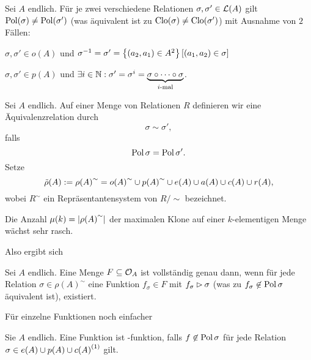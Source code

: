 \documentclass{book}
\begin{document}
\begin{remark}
    Sei $A$ endlich. Für je zwei verschiedene Relationen $\sigma, \sigma'\in\mathcal{L}(A)$ gilt $\mathop\mathrm{Pol}(\sigma)\neq \mathop\mathrm{Pol}(\sigma')$ (was äquivalent ist zu $\mathrm{Clo}(\sigma)\neq\mathrm{Clo}(\sigma')$) mit Ausnahme von $2$ Fällen:
    \begin{statements}
            \item $\sigma,\sigma'\in o(A)$ und $\sigma^{-1}=\sigma'=\left\{(a_2,a_1)\in A^2\right\}[(a_1,a_2)\in \sigma]$
            \item $\sigma,\sigma'\in p(A)$ und $\exists i\in \mathbb{N}:\sigma'=\sigma^i=\underbrace{\sigma\circ \cdots \circ\sigma}_{\textrm{$i$-mal}}$.
    \end{statements}
\end{remark}

\begin{definition}
    Sei $A$ endlich. Auf einer Menge von Relationen $R$ definieren wir eine Äquivalenzrelation durch
    $$
    \sigma\sim\sigma',
    $$
    falls
    $$
    \mathop\mathrm{Pol}\sigma = \mathop\mathrm{Pol}\sigma'.
    $$
    Setze
    $$
    \tilde\rho(A):={\rho(A)}^{\sim}={o(A)}^{\sim}\cup {p(A)}^{\sim}\cup e(A)\cup a(A)\cup c(A)\cup r(A),
    $$
    wobei $R^{\sim}$ ein Repräsentantensystem von $R/\sim$ bezeichnet.
\end{definition}

\begin{remark}
    Die Anzahl $\mu(k)=\left|{\rho(A)}^{\sim}\right|$ der maximalen Klone auf einer $k$-elementigen Menge wächst sehr rasch.
\end{remark}

Also ergibt sich
%
\begin{corollary}
    Sei $A$ endlich. Eine Menge $F\subseteq \mathcal{O}_A$ ist vollständig genau dann, wenn für jede Relation $\sigma\in{\rho(A)}^{\sim}$ eine Funktion $f_\sigma\in F$ mit $f_\sigma\rhd\sigma$ (was zu $f_\sigma\not\in \mathop\mathrm{Pol}\sigma$ äquivalent ist), existiert.
\end{corollary}

Für einzelne Funktionen noch einfacher

\begin{proposition}
    Sie $A$ endlich. Eine Funktion ist -funktion, falls $f\not\in\mathop\mathrm{Pol}\sigma$ für jede Relation $\sigma\in e(A)\cup p(A)\cup {c(A)}^{(1)}$ gilt.
\end{proposition}
\end{document}
